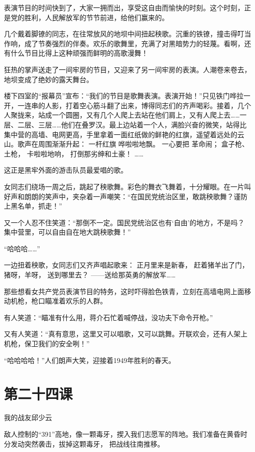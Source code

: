 \documentclass[12pt,UTF8]{ctexbook}
\begin{document}
表演节目的时间快到了，大家一拥而出，享受这自由而愉快的时刻。这个时刻，正是党的胜利，人民解放军的节节前进，给他们赢来的。

几个戴着脚镣的同志，在往常放风的地坝中间扭起秧歌。沉重的铁镣，撞击得叮当作响，成了节奏强烈的伴奏。欢乐的歌舞里，充满了对黑暗势力的轻蔑。看啊，还有什么节目比得上这种顽强而鲜明的高歌漫舞！

狂热的掌声送走了一间牢房的节目，又迎来了另一间牢房的表演。人潮卷来卷去，地坝变成了绝妙的露天舞台。

楼下四室的“报幕员”宣布：“我们的节目是歌舞表演。表演开始！”只见铁门哗拉一开，一连串的人影，打着空心筋斗翻了出来，博得同志们的齐声喝彩。接着，几个人聚拢来，站成一个圆圈，又有几个人爬上去站在他们肩上，又有人爬上去……一层、二层、三层……他们在叠罗汉。最上边站着一个人，满脸兴奋的微笑，站得比集中营的高墙、电网更高，手里拿着一面红纸做的鲜艳的红旗，遥望着远处的云山。歌声在周围渐渐升起：
一杆红旗
哗啦啦地飘。
一心要把
革命闹；
盒子枪、土枪，
卡啦啦地响，
打倒那劣绅和土豪！
……

这正是黑牢外面的游击队员最爱唱的歌。

女同志们绕场一周之后，跳起了秧歌舞。彩色的舞衣飞舞着，十分耀眼。在一片叫好声和朗朗的笑声中，夹杂着一声嘲笑：“在国民党统治区里，敢跳秧歌舞？谨防上黑名单，抓走！”

又一个人忍不住笑道：“那倒不一定。国民党统治区也有‘自由’的地方，不是吗？集中营里，可以自由自在地大跳秧歌舞！”

“哈哈哈……”

一边扭着秧歌，女同志们又齐声唱起歌来：
正月里来是新春，
赶着猪羊出了门，
猪呀，羊呀，
送到哪里去？
——送给那英勇的解放军……

那些想看女共产党员表演节目的特务，这时吓得脸色铁青，立刻在高墙电网上面移动机枪，枪口瞄准着欢乐的人群。

有人笑道：“瞄准有什么用，蒋介石忙着喊停战，没功夫下命令开枪。”

又有人笑道：“真有意思，这里又可以唱歌，又可以跳舞。开联欢会，还有人架上机枪，保卫我们的安全咧！”

“哈哈哈哈！”人们朗声大笑，迎接着1949年胜利的春天。

\section{第二十四课}

我的战友邱少云

敌人控制的“391”高地，像一颗毒牙，揳入我们志愿军的阵地。我们准备在黄昏时分发动突然袭击，拔掉这颗毒牙，
把战线往南推移。
\end{document}
